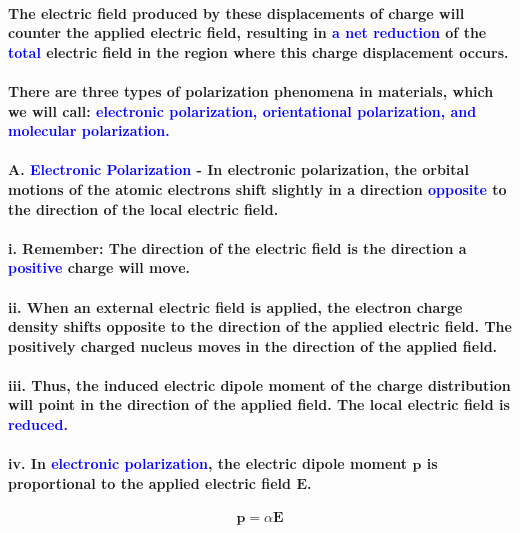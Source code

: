 \documentclass{article}
\begin{document}
\paragraph{\indent The electric field produced by these displacements of charge will counter the applied electric field, resulting in \textcolor{blue}{a net reduction} of the \textcolor{blue}{total} electric field in the region where this charge displacement occurs.}
\paragraph{\indent There are three types of polarization phenomena in materials, which we will call: \textcolor{blue}{electronic polarization, orientational polarization, and molecular polarization.}}
\paragraph{A. \textcolor{blue}{Electronic Polarization} - In electronic polarization, the orbital motions of the atomic electrons shift slightly in a direction \textcolor{blue}{opposite} to the direction of the local electric field.}
\paragraph{\indent i. Remember: The direction of the electric field is the direction a \textcolor{blue}{positive} charge will move.}
\paragraph{\indent ii. When an external electric field is applied, the electron charge density shifts opposite to the direction of the applied electric field. The positively charged nucleus moves in the direction of the applied field.}
\paragraph{\indent iii. Thus, the induced electric dipole moment of the charge distribution will point in the direction of the applied field. The local electric field is \textcolor{blue}{reduced.}}
\paragraph{\indent iv. In \textcolor{blue}{electronic polarization}, the electric dipole moment $\boldsymbol{p}$ is proportional to the applied electric field $\boldsymbol{E}$.}
\begin{equation*}
    \boldsymbol{p}=\alpha\boldsymbol{E}
\end{equation*}
\end{document}
